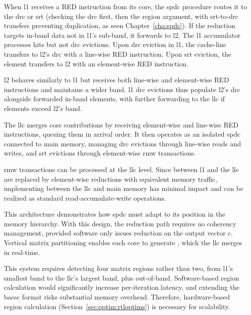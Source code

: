 When \acrshort{l1} receives a RED instruction from its core, the \acrlong{spdc} procedure routes it to the \acrshort{drc} or \acrshort{srt} (checking the \acrshort{drc} first, then the region argument, with \acrshort{srt}-to-\acrshort{drc} transfers preventing duplication, as seen Chapter~\ref{cha:spdc}).
If the \gls{reduction} targets in-\gls{band} data not in \acrshort{l1}'s sub-\gls{band}, it forwards to \acrshort{l2}.
The \acrshort{l1} accumulator processes \glspl{hit} but not \acrshort{drc} \glspl{eviction}.
Upon \acrshort{drc} \gls{eviction} in \acrshort{l1}, the cache-line transfers to \acrshort{l2}'s \acrshort{drc} with a line-wise RED instruction.
Upon \acrshort{srt} \gls{eviction}, the element transfers to \acrshort{l2} with an element-wise RED instruction.

\acrshort{l2} behaves similarly to \acrshort{l1} but receives both line-wise and element-wise RED instructions and maintains a wider \gls{band}.
\acrshort{l1} \acrshort{drc} \glspl{eviction} thus populate \acrshort{l2}'s \acrshort{drc} alongside forwarded in-\gls{band} elements, with further forwarding to the \acrshort{llc} if elements exceed \acrshort{l2}'s \gls{band}.

The \acrshort{llc} merges core contributions by receiving element-wise and line-wise RED instructions, queuing them in arrival order.
It then operates as an isolated \acrlong{spdc} connected to main memory, managing \acrshort{drc} \glspl{eviction} through line-wise reads and writes, and \acrshort{srt} \glspl{eviction} through element-wise \acrshort{rmw} transactions.

\acrshort{rmw} transactions can be processed at the \acrshort{llc} level.
Since  between \acrshort{l1} and the \acrshort{llc} are replaced by element-wise \glspl{reduction} with equivalent memory traffic, implementing  between the \acrshort{llc} and main memory has minimal impact and can be realized as standard read-accumulate-write operations.

This architecture demonstrates how \acrlong{spdc} must adapt to its position in the memory hierarchy.
With this design, the \gls{reduction} path requires no coherency management, provided software only issues \gls{reduction} on the output vector $c$.
Vertical matrix partitioning enables each core to generate , which the \acrshort{llc} merges in real-time.

This system requires detecting four matrix regions rather than two, from \acrshort{l1}'s smallest \gls{band} to the \acrshort{llc}'s largest \gls{band}, plus out-of-\gls{band}.
Software-based region calculation would significantly increase per-iteration latency, and extending the \acrshort{bacsc} format risks substantial memory overhead.
Therefore, hardware-based region calculation (Section~\ref{sec:optim:rtloptims}) is necessary for scalability.

